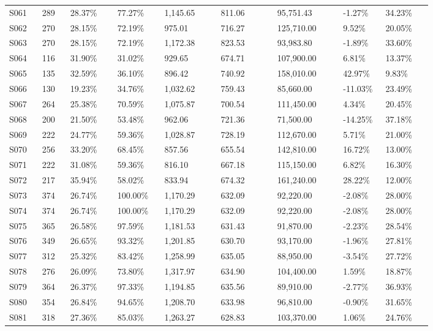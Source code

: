 \begin{longtable}{@{}p{0.07\linewidth}p{0.06\linewidth}p{0.1\linewidth}p{0.1\linewidth}p{0.12\linewidth}p{0.12\linewidth}p{0.14\linewidth}p{0.09\linewidth}p{0.1\linewidth}@{}}
S061 & 289 & 28.37\% & 77.27\% & 1,145.65 & 811.06 & 95,751.43 & -1.27\% & 34.23\% \\
S062 & 270 & 28.15\% & 72.19\% & 975.01 & 716.27 & 125,710.00 & 9.52\% & 20.05\% \\
S063 & 270 & 28.15\% & 72.19\% & 1,172.38 & 823.53 & 93,983.80 & -1.89\% & 33.60\% \\
S064 & 116 & 31.90\% & 31.02\% & 929.65 & 674.71 & 107,900.00 & 6.81\% & 13.37\% \\
S065 & 135 & 32.59\% & 36.10\% & 896.42 & 740.92 & 158,010.00 & 42.97\% & 9.83\% \\
S066 & 130 & 19.23\% & 34.76\% & 1,032.62 & 759.43 & 85,660.00 & -11.03\% & 23.49\% \\
S067 & 264 & 25.38\% & 70.59\% & 1,075.87 & 700.54 & 111,450.00 & 4.34\% & 20.45\% \\
S068 & 200 & 21.50\% & 53.48\% & 962.06 & 721.36 & 71,500.00 & -14.25\% & 37.18\% \\
S069 & 222 & 24.77\% & 59.36\% & 1,028.87 & 728.19 & 112,670.00 & 5.71\% & 21.00\% \\
S070 & 256 & 33.20\% & 68.45\% & 857.56 & 655.54 & 142,810.00 & 16.72\% & 13.00\% \\
S071 & 222 & 31.08\% & 59.36\% & 816.10 & 667.18 & 115,150.00 & 6.82\% & 16.30\% \\
S072 & 217 & 35.94\% & 58.02\% & 833.94 & 674.32 & 161,240.00 & 28.22\% & 12.00\% \\
S073 & 374 & 26.74\% & 100.00\% & 1,170.29 & 632.09 & 92,220.00 & -2.08\% & 28.00\% \\
S074 & 374 & 26.74\% & 100.00\% & 1,170.29 & 632.09 & 92,220.00 & -2.08\% & 28.00\% \\
S075 & 365 & 26.58\% & 97.59\% & 1,181.53 & 631.43 & 91,870.00 & -2.23\% & 28.54\% \\
S076 & 349 & 26.65\% & 93.32\% & 1,201.85 & 630.70 & 93,170.00 & -1.96\% & 27.81\% \\
S077 & 312 & 25.32\% & 83.42\% & 1,258.99 & 635.05 & 88,950.00 & -3.54\% & 27.72\% \\
S078 & 276 & 26.09\% & 73.80\% & 1,317.97 & 634.90 & 104,400.00 & 1.59\% & 18.87\% \\
S079 & 364 & 26.37\% & 97.33\% & 1,194.85 & 635.56 & 89,910.00 & -2.77\% & 36.93\% \\
S080 & 354 & 26.84\% & 94.65\% & 1,208.70 & 633.98 & 96,810.00 & -0.90\% & 31.65\% \\
S081 & 318 & 27.36\% & 85.03\% & 1,263.27 & 628.83 & 103,370.00 & 1.06\% & 24.76\% \\

\end{longtable}
